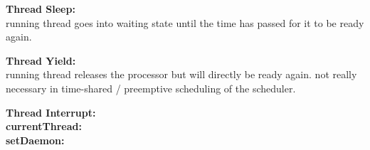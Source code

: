 \textbf{Thread Sleep:} \\
running thread goes into waiting state until the time has passed for it to be ready again.

\textbf{Thread Yield:} \\
running thread releases the processor but will directly be ready again. not really necessary in time-shared / preemptive scheduling of the scheduler.

\textbf{Thread Interrupt:} \\

\textbf{currentThread:} \\

\textbf{setDaemon:} \\